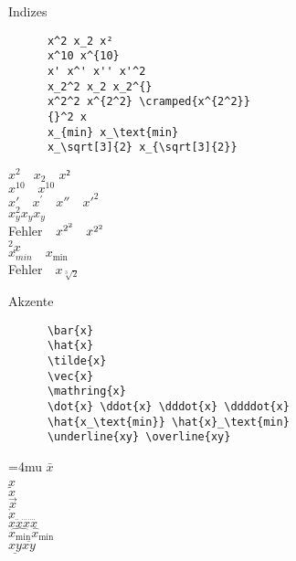 \begin{frame}[fragile]{Indizes}
  \begin{CodeExample}{0.50}
    \begin{lstlisting}
      x^2 x_2 x²
      x^10 x^{10}
      x' x^' x'' x'^2
      x_2^2 x_2 x_2^{}
      x^2^2 x^{2^2} \cramped{x^{2^2}}
      {}^2 x
      x_{min} x_\text{min}
      x_\sqrt[3]{2} x_{\sqrt[3]{2}}
    \end{lstlisting}
  \CodeResult
    $x^2 \quad x_2 \quad x²$ \\
    $x^10 \quad x^{10}$ \\
    $x' \quad x^{'} \quad x'' \quad x'^2$ \\
    $x_y^2 x_y x_y^{}$ \\
    Fehler$\quad x^{2^2} \quad \cramped{x^{2^2}}$ \\
    ${}^2 x$ \\
    $x_{min} \quad x_\text{min}$ \\
    Fehler$\quad x_{\sqrt[3]{2}}$
  \end{CodeExample}
\end{frame}

\begin{frame}[fragile]{Akzente}
  \begin{CodeExample}{0.70}
    \begin{lstlisting}
      \bar{x}
      \hat{x}
      \tilde{x}
      \vec{x}
      \mathring{x}
      \dot{x} \ddot{x} \dddot{x} \ddddot{x}
      \hat{x_\text{min}} \hat{x}_\text{min}
      \underline{xy} \overline{xy}
    \end{lstlisting}
  \CodeResult
    \Umathordordspacing\textstyle=4mu
    $\bar{x}$ \\
    $\hat{x}$ \\
    $\tilde{x}$ \\
    $\vec{x}$ \\
    $\mathring{x}$ \\
    $\dot{x} \ddot{x} \dddot{x} \ddddot{x}$ \\
    $\hat{x_\text{min}} \hat{x}_\text{min}$ \\
    $\underline{xy} \overline{xy}$
  \end{CodeExample}
\end{frame}

